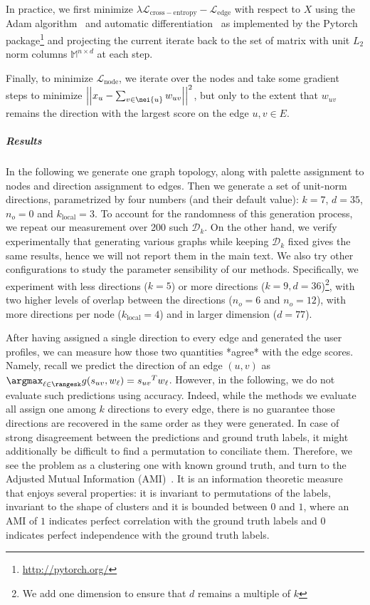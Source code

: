 In practice, we first minimize $\lambda \mathcal{L}_{\mathrm{cross-entropy}} -
\mathcal{L}_{\mathrm{edge}}$ with respect to $X$ using the Adam algorithm~\autocite{Adam15} and
automatic differentiation~\autocite{autograd15} as implemented by the Pytorch
package\footnote{\url{http://pytorch.org/}} and projecting the current iterate back to the set of
matrix with unit $L_2$ norm columns $\mathbb{M}^{n\times d}$ at each step.

Finally, to minimize $\mathcal{L}_{\mathrm{node}}$, we iterate over the nodes and take some gradient
steps to minimize $\left|\left| x_u - \sum_{v\in\nei{u}} w_{uv}\right|\right|^2$, but only to the
extent that $w_{uv}$ remains the direction with the largest score on the edge $u,v \in E$.

\subparagraph{Results}
\label{par:edge_synth_results}

In the following we generate one graph topology, along with palette assignment to nodes and
direction assignment to edges. Then we generate a set of unit-norm directions,
parametrized by four numbers (and their default value): $k=7$, $d=35$, $n_o=0$ and
$k_{\mathrm{local}}=3$. To account for the randomness of this generation process, we repeat our
measurement over 200 such $\mathcal{D}_k$. On the other hand, we verify experimentally that
generating various graphs while keeping $\mathcal{D}_k$ fixed gives the same results, hence we will
not report them in the main text.
We also try other configurations to study the parameter sensibility of our methods. Specifically, we
experiment with less directions ($k=5$) or more directions ($k=9, d=36$)\footnote{We add one
dimension to ensure that $d$ remains a multiple of $k$}, with two higher levels of overlap between
the directions ($n_o=6$ and $n_o=12$), with more directions per node ($k_{\mathrm{local}}=4$) and in
larger dimension ($d=77$).

After having assigned a single direction to every edge and generated the user profiles, we can
measure how those two quantities *agree* with the edge scores. Namely, recall we predict the
direction of an edge $(u,v)$ as $\argmax_{\ell \in \rangesk} g(s_{uv}, w_\ell) = {s_{uv}}^T w_\ell$.
However, in the following, we do not evaluate such predictions using accuracy. Indeed, while the
methods we evaluate all assign one among $k$ directions to every edge, there is no guarantee those
directions are recovered in the same order as they were generated. In case of strong disagreement
between the predictions and ground truth labels, it might additionally be difficult to find a
permutation to conciliate them.  Therefore, we see the problem as a clustering one with known ground
truth, and turn to the Adjusted Mutual Information (AMI)~\autocite{AMI09}. It is an information
theoretic measure that enjoys several properties: it is invariant to permutations of the labels,
invariant to the shape of clusters and it is bounded between $0$ and $1$, where an AMI of $1$
indicates perfect correlation with the ground truth labels and $0$ indicates perfect independence
with the ground truth labels.

